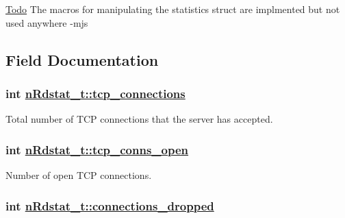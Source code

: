 \begin{Desc}
\item[\hyperlink{todo__todo000007}{Todo}]The macros for manipulating the statistics struct are implmented but not used anywhere -mjs \end{Desc}




\subsection{Field Documentation}
\hypertarget{structnRdstat__t_afc21d80b9ea15c65cff7b4cec7973e5}{
\subsubsection[tcp\_\-connections]{\setlength{\rightskip}{0pt plus 5cm}int \hyperlink{structnRdstat__t_afc21d80b9ea15c65cff7b4cec7973e5}{n\-Rdstat\_\-t::tcp\_\-connections}}}
\label{structnRdstat__t_afc21d80b9ea15c65cff7b4cec7973e5}


Total number of TCP connections that the server has accepted. \hypertarget{structnRdstat__t_564faff52a7149d351488516cffbfc35}{
\subsubsection[tcp\_\-conns\_\-open]{\setlength{\rightskip}{0pt plus 5cm}int \hyperlink{structnRdstat__t_564faff52a7149d351488516cffbfc35}{n\-Rdstat\_\-t::tcp\_\-conns\_\-open}}}
\label{structnRdstat__t_564faff52a7149d351488516cffbfc35}


Number of open TCP connections. \hypertarget{structnRdstat__t_7e77d4adf8d902e944de8ed14bc4691e}{
\subsubsection[connections\_\-dropped]{\setlength{\rightskip}{0pt plus 5cm}int \hyperlink{structnRdstat__t_7e77d4adf8d902e944de8ed14bc4691e}{n\-Rdstat\_\-t::connections\_\-dropped}}}
\label{structnRdstat__t_7e77d4adf8d902e944de8ed14bc4691e}


